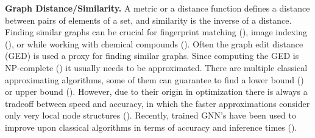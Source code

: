 \textbf{Graph Distance/Similarity.} A metric or a distance function defines a distance between pairs of elements of a set, and similarity is the inverse of a distance. Finding similar graphs can be crucial for fingerprint matching (\citealp{fingerprint2005}), image indexing (\citealp{image_index2008}), or while working with chemical compounds (\citealp{chem2006}). Often the graph edit distance (GED) is used a proxy for finding similar graphs. Since computing the GED is NP-complete (\citealp{np_complete1998}) it usually needs to be approximated. There are multiple classical approximating algorithms, some of them can guarantee to find a lower bound (\citealp{hungarian2009}) or upper bound (\citealp{hed2015}). However, due to their origin in optimization there is always a tradeoff between speed and accuracy, in which the faster approximations consider only very local node structures (\citealp{hungarian2009}). Recently, trained GNN's have been used to improve upon classical algorithms in terms of accuracy and inference times (\citealp{bai2019}). %
